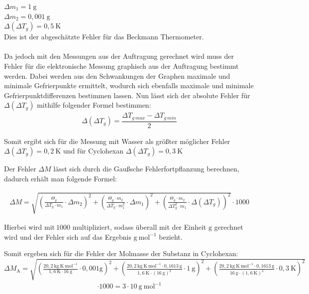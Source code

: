\documentclass[12pt,a4paper,titlepage,headinclude,bibtotoc]{scrartcl}
\begin{document}
$\Delta m_1 = 1{~}\mathrm{g}  $\\
$\Delta m_2 = 0,001{~}\mathrm{g}  $\\
$\Delta (\Delta T_g) = 0,5{~}\text{K}  $\\ Dies ist der abgeschätzte Fehler für das Beckmann Thermometer.\\\\
Da jedoch mit den Messungen aus der Auftragung gerechnet wird muss der Fehler für die elektronische Messung graphisch aus der Auftragung bestimmt werden. Dabei werden aus den Schwankungen der Graphen maximale und minimale Gefrierpunkte ermittelt, wodurch sich ebenfalls maximale und minimale Gefrierpunktdifferenzen bestimmen lassen. Nun lässt sich der absolute Fehler für $\Delta (\Delta T_g)$ mithilfe folgender Formel bestimmen:
\begin{align}
\Delta (\Delta T_g) = \dfrac{ \Delta T_{g\mathrm{~}{max}}-\Delta T_{g\mathrm{~}{min}}}{2}
\end{align}

Somit ergibt sich für die Messung mit Wasser als größter möglicher Fehler $\Delta (\Delta T_g) = 0,2{~\mathrm{K}}$  und für Cyclohexan $\Delta (\Delta T_g) = 0,3{~\mathrm{K}}$

Der Fehler $\Delta M$ lässt sich durch die Gaußsche Fehlerfortpflanzung berechnen, dadurch erhält man folgende Formel:

\begin{align}
\Delta M = \sqrt{ \left( \frac {\Theta _g}{ \Delta T_g\cdot m_1} \cdot \Delta m_2 \right)^2 + \left( \frac {\Theta _g \cdot m_2 }{ \Delta T_g\cdot m_1^2 } \cdot \Delta m_1 \right)^2 + \left( \frac {\Theta _g \cdot m_2 }{ \Delta T_g^2 \cdot m_1} \cdot \Delta (\Delta T_g) \right)^2 } \cdot 1000
\end{align}

Hierbei wird $\mathrm{mit {~}1000}$ multipliziert, sodass überall mit der Einheit $\mathrm{g}$ gerechnet wird und der Fehler sich auf das Ergebnis $\mathrm{g{~} mol^{-1}}$ bezieht.

Somit ergeben sich für die Fehler der Molmasse der Substanz in Cyclohexan:\\


$\Delta M_\mathrm{A} = \sqrt{ \left( \frac {20,2 {~}\mathrm{kg {~} K {~} mol^{-1}}}{ 1,6 {~} \mathrm{K} \cdot 16 {~}\mathrm{g}} \cdot 0,001 \mathrm{g} \right)^2 + \left( \frac { 20,2 {~}\mathrm{kg{~}K {~} mol^{-1}} \cdot 0,1613{~}\mathrm{g} }{ 1,6 {~}\text{K}\cdot (16 {~}\mathrm{g} )^2 } \cdot 1 {~} \mathrm{g} \right)^2 +  \left( \frac {20,2 {~}\mathrm{kg{~}K {~} mol^{-1}} \cdot 0,1613 {~} \mathrm{g}} { 16 {~} \mathrm{g} \cdot (1,6 {~} \text{K})^2} \cdot 0,3{~} \text{K} \right)^2}  $
\begin{align}
\cdot 1000 = 3 \cdot 10{~}\mathrm{g{~}mol^{-1}}
\end{align}
\end{document}
